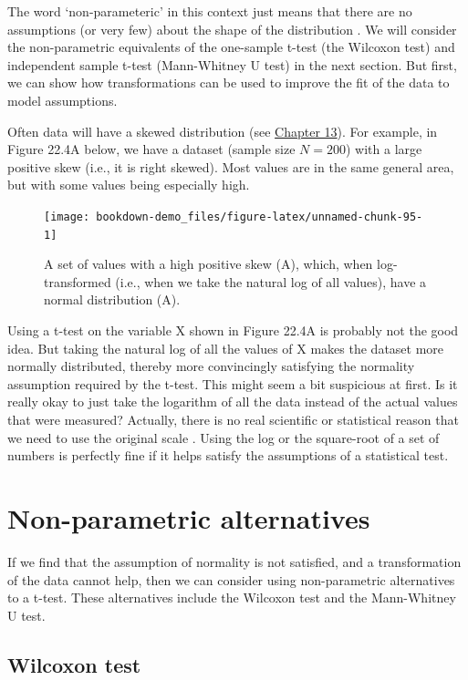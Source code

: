 \documentclass[
]{scrbook}
\begin{document}
The word `non-parameteric' in this context just means that there are no assumptions (or very few) about the shape of the distribution \citep{Dytham2011}.
We will consider the non-parametric equivalents of the one-sample t-test (the Wilcoxon test) and independent sample t-test (Mann-Whitney U test) in the next section.
But first, we can show how transformations can be used to improve the fit of the data to model assumptions.

Often data will have a skewed distribution (see \protect\hyperlink{Chapter_13}{Chapter 13}).
For example, in Figure 22.4A below, we have a dataset (sample size \(N = 200\)) with a large positive skew (i.e., it is right skewed).
Most values are in the same general area, but with some values being especially high.

\begin{figure}
\texttt{[image: bookdown-demo\_files/figure-latex/unnamed-chunk-95-1]} \caption{A set of values with a high positive skew (A), which, when log-transformed (i.e., when we take the natural log of all values), have a normal distribution (A).}\label{fig:unnamed-chunk-95}
\end{figure}

Using a t-test on the variable X shown in Figure 22.4A is probably not the good idea.
But taking the natural log of all the values of X makes the dataset more normally distributed, thereby more convincingly satisfying the normality assumption required by the t-test.
This might seem a bit suspicious at first.
Is it really okay to just take the logarithm of all the data instead of the actual values that were measured?
Actually, there is no real scientific or statistical reason that we need to use the original scale \citep{Sokal1995}.
Using the log or the square-root of a set of numbers is perfectly fine if it helps satisfy the assumptions of a statistical test.

\hypertarget{non-parametric-alternatives}{%
\section{Non-parametric alternatives}\label{non-parametric-alternatives}}

If we find that the assumption of normality is not satisfied, and a transformation of the data cannot help, then we can consider using non-parametric alternatives to a t-test.
These alternatives include the Wilcoxon test and the Mann-Whitney U test.

\hypertarget{wilcoxon-test}{%
\subsection{Wilcoxon test}\label{wilcoxon-test}}
\end{document}
